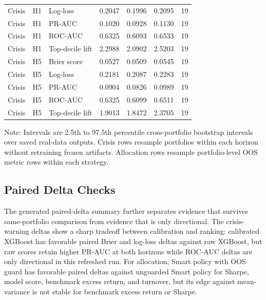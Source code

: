 \documentclass{ieeeaccess}
\newcommand{\tabnote}[1]{\vspace{2pt}\begin{flushleft}\footnotesize Note: #1\end{flushleft}}
\begin{document}
\begin{table}[t]
\begin{tabularx}{\textwidth}{l Y Y r r r r}
Crisis & H1 & Log-loss & 0.2047 & 0.1996 & 0.2095 & 19 \\
Crisis & H1 & PR-AUC & 0.1020 & 0.0928 & 0.1130 & 19 \\
Crisis & H1 & ROC-AUC & 0.6325 & 0.6093 & 0.6533 & 19 \\
Crisis & H1 & Top-decile lift & 2.2988 & 2.0902 & 2.5203 & 19 \\
Crisis & H5 & Brier score & 0.0527 & 0.0509 & 0.0545 & 19 \\
Crisis & H5 & Log-loss & 0.2181 & 0.2087 & 0.2283 & 19 \\
Crisis & H5 & PR-AUC & 0.0904 & 0.0826 & 0.0989 & 19 \\
Crisis & H5 & ROC-AUC & 0.6325 & 0.6099 & 0.6511 & 19 \\
Crisis & H5 & Top-decile lift & 1.9013 & 1.8472 & 2.3705 & 19 \\
\bottomrule
\end{tabularx}
\tabnote{Intervals are 2.5th to 97.5th percentile cross-portfolio bootstrap intervals over saved real-data outputs. Crisis rows resample portfolios within each horizon without retraining frozen artifacts. Allocation rows resample portfolio-level OOS metric rows within each strategy.}
\end{table}

\subsection{Paired Delta Checks}
The generated paired-delta summary further separates evidence that survives same-portfolio comparison from evidence that is only directional. The crisis-warning deltas show a sharp tradeoff between calibration and ranking: calibrated XGBoost has favorable paired Brier and log-loss deltas against raw XGBoost, but raw scores retain higher PR-AUC at both horizons while ROC-AUC deltas are only directional in this refreshed run. For allocation, Smart policy with OOS guard has favorable paired deltas against unguarded Smart policy for Sharpe, model score, benchmark excess return, and turnover, but its edge against mean-variance is not stable for benchmark excess return or Sharpe.
\end{document}

